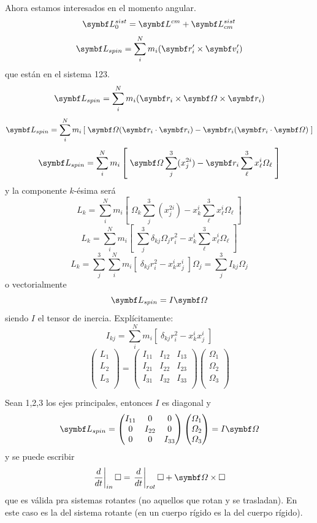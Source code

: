 \documentclass[10pt,oneside]{CBFT_book}
\begin{document}
Ahora estamos interesados en el momento angular.
\[
	\vb{L}_0^{sist} = \vb{L}^{cm} + \vb{L}_{cm}^{sist} 
\]
\[
	\vb{L}_{spin} = \sum_i^N m_i ( \vb{r}_i' \times \vb{v}_i' )
\]
que están en el sistema 123.
\[
	\vb{L}_{spin} = \sum_i^N m_i ( \vb{r}_i \times \vb{\Omega} \times \vb{r}_i )
\]
\[
	\vb{L}_{spin} = \sum_i^N m_i \left[ \; 
	\vb{\Omega} (\vb{r}_i\cdot\vb{r}_i) - \vb{r}_i(\vb{r}_i \cdot \vb{\Omega}) \; \right] 
\]
\[
	\vb{L}_{spin} = \sum_i^N m_i \left[ \; 
	\vb{\Omega} \sum_j^3 (x_j^{2i}) - \vb{r}_i \sum_\ell^3 x_\ell^i \Omega_\ell  \; \right] 
\]
y la componente $k$-ésima será 
\[
	L_k = \sum_i^N m_i \left[ \; 
	\Omega_k \sum_j^3 (x_j^{2i}) - x_k^i \sum_\ell^3 x_\ell^i \Omega_\ell  \; \right] 
\]
\[
	L_k = \sum_i^N m_i \left[ \; 
	\sum_j^3 \delta_{kj} \Omega_j r_i^{2} - x_k^i \sum_\ell^3 x_\ell^i \Omega_\ell  \; \right] 
\]
\[
	L_k = \sum_j^3 \sum_i^N m_i \left[ \; 
	\delta_{kj} r_i^{2} - x_k^i x_j^i  \; \right] \Omega_j = \sum_j^3 I_{kj} \Omega_j 
\]
o vectorialmente
\[
	\vb{L}_{spin} = I \vb{\Omega}
\]
siendo $I$ el tensor de inercia. Explícitamente:
\[
	I_{kj} = \sum_i^N m_i \left[ \; \delta_{kj} r_i^{2} - x_k^i x_j^i  \; \right]
\]
\[
	\begin{pmatrix}
		L_1 \\
		L_2 \\ 
		L_3  \\
	\end{pmatrix} 
	=
	\begin{pmatrix}
		I_{11} & I_{12} & I_{13} \\
		I_{21} & I_{22} & I_{23} \\ 
		I_{31} & I_{32} & I_{33}  \\
	\end{pmatrix}
	\begin{pmatrix}
		\Omega_1 \\
		\Omega_2 \\ 
		\Omega_3  \\
	\end{pmatrix} 
\]

Sean 1,2,3 los ejes principales, entonces $I$ es diagonal y
\[
	\vb{L}_{spin}
	=
	\begin{pmatrix}
		I_{11} & 0 & 0 \\
		0 & I_{22} & 0 \\ 
		0 & 0 & I_{33}  \\
	\end{pmatrix}
	\begin{pmatrix}
		\Omega_1 \\
		\Omega_2 \\ 
		\Omega_3  \\
	\end{pmatrix}
	=
	I \vb{\Omega}
\]
y se puede escribir
\[
	\left.\frac{d}{dt}\right|_{in} \Box = \left.\frac{d}{dt}\right|_{rot} \Box + \vb{\Omega} \times \Box
\]
que es válida pra sistemas rotantes (no aquellos que rotan y se trasladan).
En este caso \vb{\Omega} es la del sistema rotante (en un cuerpo rígido es la \vb{\Omega} del cuerpo rígido).
\end{document}

